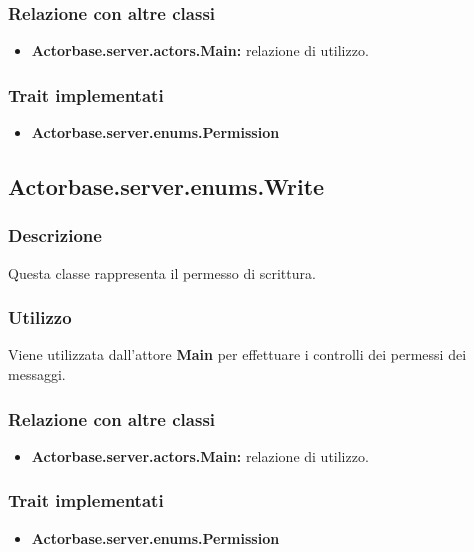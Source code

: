 \documentclass[a4paper]{article}
\begin{document}
			\subsubsection{Relazione con altre classi}
				\begin{itemize}
					\item \textbf{Actorbase.server.actors.Main:} relazione di utilizzo.
				\end{itemize}
						
			\subsubsection{Trait implementati}
				\begin{itemize}
					\item \textbf{Actorbase.server.enums.Permission} 
				\end{itemize}
				
		\subsection{Actorbase.server.enums.Write}
			\subsubsection{Descrizione}
				Questa classe rappresenta il permesso di scrittura.
				
			\subsubsection{Utilizzo}
				Viene utilizzata dall'attore \textbf{Main} per effettuare i controlli dei permessi dei messaggi. 
				
			\subsubsection{Relazione con altre classi}
				\begin{itemize}
					\item \textbf{Actorbase.server.actors.Main:} relazione di utilizzo.
				\end{itemize}
				
			\subsubsection{Trait implementati}
				\begin{itemize}
					\item \textbf{Actorbase.server.enums.Permission} 
				\end{itemize}
		
\end{document}
